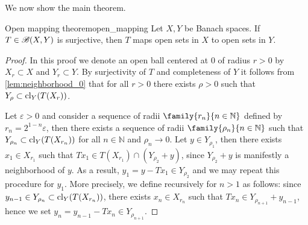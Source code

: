 We now show the main theorem.
\begin{theorem}{Open mapping theorem}{open_mapping}
    Let \(X, Y\) be Banach spaces. If \(T \in \mathscr{B}(X, Y)\) is surjective, then \(T\) maps open sets in \(X\) to open sets in \(Y\).
\end{theorem}
\begin{proof}
    In this proof we denote an open ball centered at 0 of radius \(r > 0\) by \(X_r \subset X\) and \(Y_r \subset Y\). By surjectivity of \(T\) and completeness of \(Y\) it follows from \cref{lem:neighborhood_0} that for all \(r > 0\) there exists \(\rho > 0\) such that \(Y_\rho \subset \operatorname{cl}_Y(T(X_r))\).

    Let \(\varepsilon > 0\) and consider a sequence of radii \(\family{r_n}{n\in \mathbb{N}}\) defined by \(r_n = 2^{1-n}\varepsilon\), then there exists a sequence of radii \(\family{\rho_n}{n\in \mathbb{N}}\) such that \(Y_{\rho_n} \subset \operatorname{cl}_Y(T(X_{r_n}))\) for all \(n \in \mathbb{N}\) and \(\rho_n \to 0\). Let \(y \in Y_{\rho_1}\), then there exists \(x_1 \in X_{r_1}\) such that \(Tx_1 \in T(X_{r_1}) \cap (Y_{\rho_2} + y)\), since \(Y_{\rho_2} + y\) is manifestly a neighborhood of \(y\). As a result, \(y_1 = y - Tx_1 \in Y_{\rho_2}\) and we may repeat this procedure for \(y_1\). More precisely, we define recursively for \(n > 1\) as follows: since \(y_{n-1} \in Y_{\rho_n} \subset \operatorname{cl}_Y(T(X_{r_n}))\), there exists \(x_n \in X_{r_n}\) such that \(Tx_n \in Y_{\rho_{n+1}} + y_{n-1}\), hence we set \(y_n = y_{n-1} - Tx_n \in Y_{\rho_{n+1}}\).


\end{proof}
